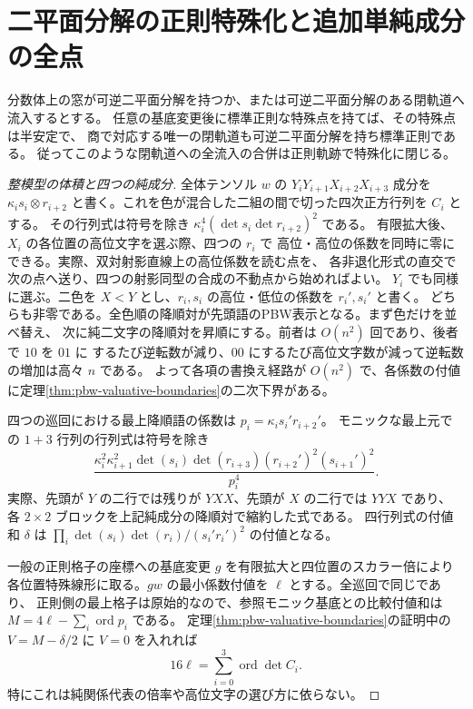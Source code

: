 \section{二平面分解の正則特殊化と追加単純成分の全点}
\label{sec:split-regular-limits}
\begin{theorem}\label{thm:split-regular-limits}
分数体上の窓が可逆二平面分解を持つか、または可逆二平面分解のある閉軌道へ流入するとする。
任意の基底変更後に標準正則な特殊点を持てば、その特殊点は半安定で、
商で対応する唯一の閉軌道も可逆二平面分解を持ち標準正則である。
従ってこのような閉軌道への全流入の合併は正則軌跡で特殊化に閉じる。
\end{theorem}
\begin{proof}[整模型の体積と四つの純成分]
全体テンソル $w$ の $Y_iY_{i+1}X_{i+2}X_{i+3}$ 成分を
$\kappa_i s_i\otimes r_{i+2}$ と書く。これを色が混合した二組の間で切った四次正方行列を $C_i$ とする。
その行列式は符号を除き $\kappa_i^4(\det s_i\det r_{i+2})^2$ である。
有限拡大後、$X_i$ の各位置の高位文字を選ぶ際、四つの $r_i$ で
高位・高位の係数を同時に零にできる。実際、双対射影直線上の高位係数を読む点を、
各非退化形式の直交で次の点へ送り、四つの射影同型の合成の不動点から始めればよい。
$Y_i$ でも同様に選ぶ。二色を $X<Y$ とし、$r_i,s_i$ の高位・低位の係数を $r_i',s_i'$ と書く。
どちらも非零である。全色順の降順対が先頭語のPBW表示となる。まず色だけを並べ替え、
次に純二文字の降順対を昇順にする。前者は $O(n^2)$ 回であり、後者で $10$ を $01$ に
するたび逆転数が減り、$00$ にするたび高位文字数が減って逆転数の増加は高々 $n$ である。
よって各項の書換え経路が $O(n^2)$ で、各係数の付値に定理\ref{thm:pbw-valuative-boundaries}の二次下界がある。

四つの巡回における最上降順語の係数は $p_i=\kappa_i s_i' r_{i+2}'$。
モニックな最上元での $1+3$ 行列の行列式は符号を除き
\[
 \frac{\kappa_i^2\kappa_{i+1}^2\det(s_i)\det(r_{i+3})(r_{i+2}')^2(s_{i+1}')^2}{p_i^4}.
\]
実際、先頭が $Y$ の二行では残りが $YXX$、先頭が $X$ の二行では $YYX$ であり、
各 $2\times2$ ブロックを上記純成分の降順対で縮約した式である。
四行列式の付値和 $\delta$ は $\prod_i\det(s_i)\det(r_i)/(s_i'r_i')^2$ の付値となる。

一般の正則格子の座標への基底変更 $g$ を有限拡大と四位置のスカラー倍により
各位置特殊線形に取る。$gw$ の最小係数付値を $\ell$ とする。全巡回で同じであり、
正則側の最上格子は原始的なので、参照モニック基底との比較付値和は
$M=4\ell-\sum_i\operatorname{ord}p_i$ である。
定理\ref{thm:pbw-valuative-boundaries}の証明中の $V=M-\delta/2$ に $V=0$ を入れれば
\[
              16\ell=\sum_{i=0}^3\operatorname{ord}\det C_i .
\]
特にこれは純関係代表の倍率や高位文字の選び方に依らない。
\end{proof}
